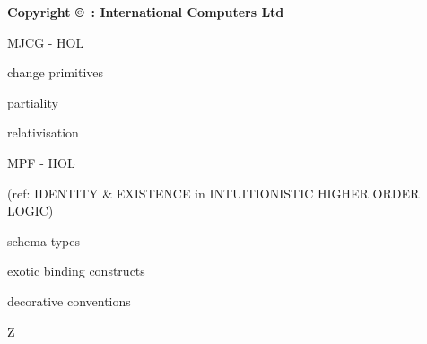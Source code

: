 % 
\def\Hide#1{}
\def\Bool{``$\it{:}bool\,$''}
\makeindex
{}  %
\def\SCCSversion{%
}
\TPPissue{\SCCSversion}  %

\TPPclass{}


\TPPsetsizes
\makeTPPfrontpage

\vfill
\begin{centering}

\bf Copyright \copyright\ : International Computers Ltd \number\year

\end{centering}

\newpage
\begin{figure}[h]
\end{figure}

\newpage
\begin{figure}[h]
\end{figure}

\newpage
{\center\huge

\vfill

MJCG - HOL

\vfill

change primitives

\vfill

partiality

\vfill

relativisation

\vfill

MPF - HOL

(ref: IDENTITY \& EXISTENCE in INTUITIONISTIC HIGHER ORDER LOGIC)

\vfill

schema types

\vfill

exotic binding constructs

\vfill

decorative conventions

\vfill

Z

\vfill

}


